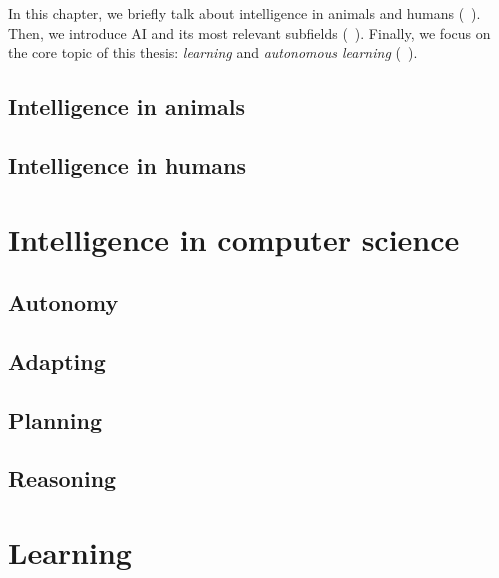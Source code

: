 In this chapter, we briefly talk about intelligence in animals and humans (~).
%
Then, we introduce \gls{AI} and its most relevant subfields (~).
%
Finally, we focus on the core topic of this thesis: \emph{learning} and \emph{autonomous learning} (~).


\subsection{Intelligence in animals}\label{subsec:intelligence-in-animals}

\subsection{Intelligence in humans}\label{subsec:intelligence-in-humans}


\section{Intelligence in computer science}\label{sec:intelligence-in-computer-science}

\subsection{Autonomy}\label{subsec:autonomy}

\subsection{Adapting}\label{subsec:adapting}

\subsection{Planning}\label{subsec:planning}

\subsection{Reasoning}\label{subsec:reasoning}


\section{Learning}\label{sec:learning}

\subsection{}\label{subsec:machine-learning}

